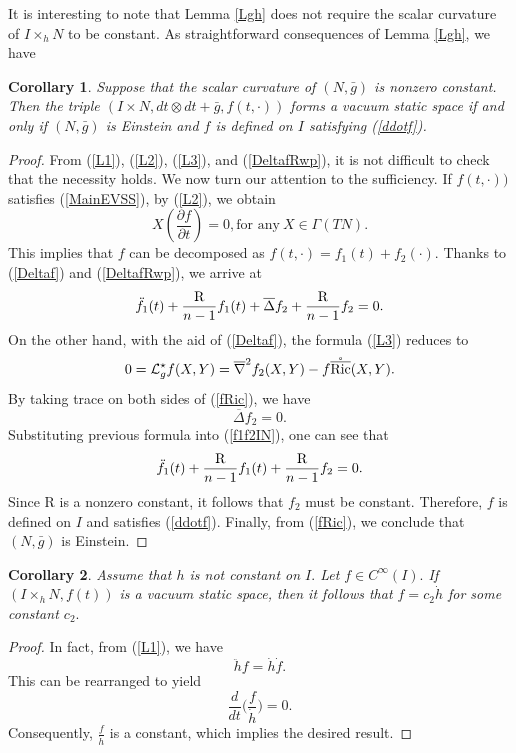 \documentclass[10pt,leqno,oneside]{amsart}
\newtheorem{Cor}{Corollary}
\begin{document}
{         It is interesting to note that Lemma \ref{Lgh} does not require the scalar curvature of $I\times_hN $ to be constant. As straightforward consequences of Lemma \ref{Lgh}, we have
    \begin{Cor}\label{INRP}
         Suppose that the scalar curvature of $(N, \bar{g})$ is nonzero constant. Then the triple $(I\times N, dt\otimes dt+\bar{g}, f(t,\cdot))$ forms a vacuum static space if and only if $(N, \bar{g})$ is Einstein and $f$ is defined on $I$ satisfying {\rm(\ref{ddotf})}.
    \end{Cor}
    \begin{proof}
         From (\ref{L1}), (\ref{L2}), (\ref{L3}), and (\ref{DeltafRwp}), it is not difficult to check that the necessity holds. We now turn our attention to the sufficiency. If $ f(t,\cdot))$ satisfies {\rm(\ref{MainEVSS})}, by {\rm(\ref{L2})}, we obtain
         $$X(\frac{\partial f}{\partial t})=0, \text{for any}~ X\in\Gamma(TN). $$
         This implies that $f$ can be decomposed as $f(t,\cdot)=f_1(t)+f_2(\cdot).$ Thanks to {\rm(\ref{Deltaf})} and (\ref{DeltafRwp}), we arrive at
         \begin{equation}\label{f1f2IN}
           \ddot{f_1}(t)+\frac{{\rm R}}{n-1}f_1(t)+\overline{\Delta}f_2+\frac{{\rm R}}{n-1}f_2=0.
         \end{equation}
         On the other hand, with the aid of {\rm(\ref{Deltaf})}, the formula {\rm(\ref{L3})} reduces to
         \begin{equation}\label{fRic}
           0=\mathcal{L}_g^{\star}f(X,Y)=\overline{\nabla}^2 f_2(X,Y)-f\mathring{\overline{{\rm{Ric}}}}(X,Y).
         \end{equation}
         By taking trace on both sides of {\rm(\ref{fRic})}, we have
         \begin{equation*}
           \overline{\Delta}f_2=0.
         \end{equation*}
         Substituting previous formula into {\rm(\ref{f1f2IN})}, one can see that
         \[\ddot{f_1}(t)+\frac{{\rm R}}{n-1}f_1(t)+\frac{{\rm R}}{n-1}f_2=0.\]
         Since \(\mathrm{R}\) is a nonzero constant, it follows that \(f_2\) must be constant. Therefore, $f$ is defined on $I$ and satisfies {\rm(\ref{ddotf})}. Finally, from {\rm(\ref{fRic})}, we conclude that $(N,\bar{g})$ is Einstein.
    \end{proof}
    \begin{Cor}\label{warpedPonh}
         Assume that $h$ is not constant on $I.$ Let $f\in C^\infty(I).$ If $(I\times_h N, f(t))$ is a vacuum static space, then it follows that $f=c_2\dot{h}$ for some constant $c_2.$
    \end{Cor}
    \begin{proof}
         In fact, from {\rm(\ref{L1})}, we have
         \[\ddot{h}f=\dot{h}\dot{f}.\]
         This can be rearranged to yield
         \[\frac{d}{dt}\Big(\frac{f}{\dot{h}}\Big)=0.\]
         Consequently, \(\frac{f}{\dot{h}}\) is a constant, which implies the desired result.
    \end{proof}

}
\end{document}
